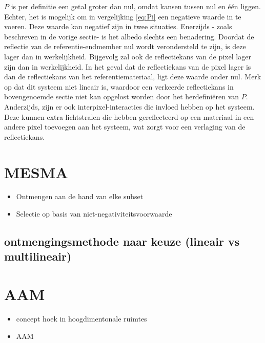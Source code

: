 \documentclass[12pt]{report}
\begin{document}
$P$ is per definitie een getal groter dan nul, omdat kansen tussen nul en \'e\'en liggen. Echter, het is mogelijk om in vergelijking \ref{eq:Pi} een negatieve waarde in te voeren. Deze waarde kan negatief zijn in twee situaties. Enerzijds - zoals beschreven in de vorige sectie- is het albedo slechts een benadering. Doordat de reflectie van de referentie-endmember nul wordt verondersteld te zijn, is deze lager dan in werkelijkheid. Bijgevolg zal ook de reflectiekans van de pixel lager zijn dan in werkelijkheid. In het geval dat de reflectiekans van de pixel lager is dan de reflectiekans van het referentiemateriaal, ligt deze waarde onder nul. Merk op dat dit systeem niet lineair is, waardoor een verkeerde reflectiekans in bovengenoemde sectie niet kan opgelost worden door het herdefini\"eren van $P$. Anderzijds, zijn er ook interpixel-interacties die invloed hebben op het systeem. Deze kunnen extra lichtstralen die hebben gereflecteerd op een materiaal in een andere pixel toevoegen aan het systeem, wat zorgt voor een verlaging van de reflectiekans. 






\section{MESMA} \label{sec:mesma}

\begin{itemize}
\item Ontmengen aan de hand van elke subset
\item Selectie op basis van niet-negativiteitsvoorwaarde
\end{itemize}

\subsection{ontmengingsmethode naar keuze (lineair vs multilineair)}

\section{AAM}

\begin{itemize}
\item concept hoek in hoogdimentonale ruimtes
\item AAM
\end{itemize}
\end{document}
